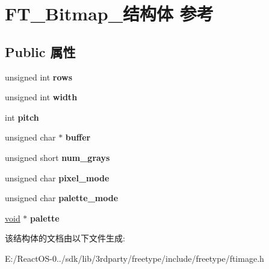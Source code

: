 \hypertarget{struct_f_t___bitmap__}{}\section{F\+T\+\_\+\+Bitmap\+\_\+结构体 参考}
\label{struct_f_t___bitmap__}
\subsection*{Public 属性}
\begin{DoxyCompactItemize}
\item 
\mbox{\label{struct_f_t___bitmap___ad857f33f4d12be88746072a7e1455270}} 
unsigned int {\bfseries rows}
\item 
\mbox{\label{struct_f_t___bitmap___a4a3dd62109eb0371f4ca8d196f713e4b}} 
unsigned int {\bfseries width}
\item 
\mbox{\label{struct_f_t___bitmap___afdee595846e1188c7a76d0cec9d85cf2}} 
int {\bfseries pitch}
\item 
\mbox{\label{struct_f_t___bitmap___a76439b1d3c13b81ca506108cd1623284}} 
unsigned char $\ast$ {\bfseries buffer}
\item 
\mbox{\label{struct_f_t___bitmap___a2465f41f8badacca572203c4bdb473e3}} 
unsigned short {\bfseries num\+\_\+grays}
\item 
\mbox{\label{struct_f_t___bitmap___a9bf1180f0b73c4161305ff0166f2652f}} 
unsigned char {\bfseries pixel\+\_\+mode}
\item 
\mbox{\label{struct_f_t___bitmap___a46b396401785e1cd90066f9cd11507f6}} 
unsigned char {\bfseries palette\+\_\+mode}
\item 
\mbox{\label{struct_f_t___bitmap___a8d5ecf4409f71bfb559e0d13d8df4d86}} 
\hyperlink{interfacevoid}{void} $\ast$ {\bfseries palette}
\end{DoxyCompactItemize}


该结构体的文档由以下文件生成\+:\begin{DoxyCompactItemize}
\item 
E\+:/\+React\+O\+S-\/0../sdk/lib/3rdparty/freetype/include/freetype/ftimage.\+h\end{DoxyCompactItemize}
